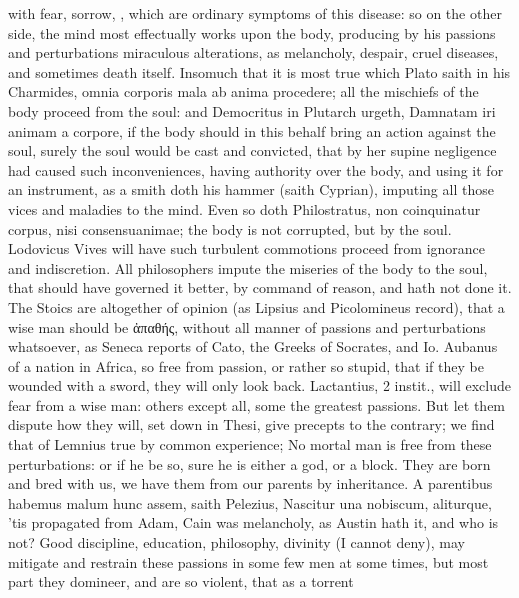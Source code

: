 {with fear, sorrow, \etc{}, which are ordinary symptoms of this disease: so
on the other side, the mind most effectually works upon the body,
producing by his passions and perturbations miraculous alterations, as
melancholy, despair, cruel diseases, and sometimes death itself.
Insomuch that it is most true which Plato saith in his Charmides, omnia
corporis mala ab anima procedere; all the mischiefs of the body
proceed from the soul: and Democritus in Plutarch urgeth,
Damnatam iri animam a corpore, if the body should in this behalf bring
an action against the soul, surely the soul would be cast and
convicted, that by her supine negligence had caused such
inconveniences, having authority over the body, and using it for an
instrument, as a smith doth his hammer (saith Cyprian), imputing
all those vices and maladies to the mind. Even so doth
Philostratus, non coinquinatur corpus, nisi consensuanimae; the
body is not corrupted, but by the soul. Lodovicus Vives will have such
turbulent commotions proceed from ignorance and indiscretion. All
philosophers impute the miseries of the body to the soul, that should
have governed it better, by command of reason, and hath not done it.
The Stoics are altogether of opinion (as Lipsius and
Picolomineus record), that a wise man should be ἀπαθής, without
all manner of passions and perturbations whatsoever, as Seneca
reports of Cato, the  Greeks of Socrates, and Io. Aubanus
of a nation in Africa, so free from passion, or rather so stupid, that
if they be wounded with a sword, they will only look back.
Lactantius, 2 instit., will exclude fear from a wise man: others
except all, some the greatest passions. But let them dispute how they
will, set down in Thesi, give precepts to the contrary; we find that of
Lemnius true by common experience; No mortal man is free from
these perturbations: or if he be so, sure he is either a god, or a
block. They are born and bred with us, we have them from our parents by
inheritance. A parentibus habemus malum hunc assem, saith
Pelezius, Nascitur una nobiscum, aliturque, 'tis propagated from
Adam, Cain was melancholy, as Austin hath it, and who is not?
Good discipline, education, philosophy, divinity (I cannot deny), may
mitigate and restrain these passions in some few men at some times, but
most part they domineer, and are so violent, that as a torrent
}
